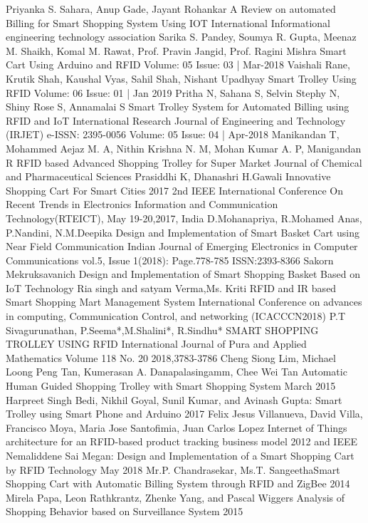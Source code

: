 \documentclass[conference]{IEEEtran}
\begin{document}
\begin{thebibliography}{00}
Priyanka S. Sahara, Anup Gade, Jayant Rohankar A Review on automated Billing for Smart Shopping System Using IOT International Informational engineering technology association 
Sarika S. Pandey, Soumya R. Gupta, Meenaz M. Shaikh, Komal M. Rawat, Prof. Pravin Jangid, Prof. Ragini Mishra Smart Cart Using Arduino and RFID Volume: 05 Issue: 03 | Mar-2018
Vaishali Rane, Krutik Shah, Kaushal Vyas, Sahil Shah, Nishant Upadhyay Smart Trolley Using RFID Volume: 06 Issue: 01 | Jan 2019
Pritha N, Sahana S, Selvin Stephy N, Shiny Rose S, Annamalai S Smart Trolley System for Automated Billing using RFID and IoT International Research Journal of Engineering and Technology (IRJET) e-ISSN: 2395-0056 Volume: 05 Issue: 04 | Apr-2018
Manikandan T, Mohammed Aejaz M. A, Nithin Krishna N. M, Mohan Kumar A. P, Manigandan R RFID based Advanced Shopping Trolley for Super Market Journal of Chemical and Pharmaceutical Sciences
Prasiddhi K, Dhanashri H.Gawali Innovative Shopping Cart For Smart Cities 2017 2nd IEEE International Conference On Recent Trends in Electronics Information and Communication Technology(RTEICT), May 19-20,2017, India
D.Mohanapriya, R.Mohamed Anas, P.Nandini, N.M.Deepika Design and Implementation of Smart Basket Cart using Near Field Communication Indian Journal of Emerging Electronics in Computer Communications vol.5, Issue 1(2018): Page.778-785 ISSN:2393-8366
Sakorn Mekruksavanich Design and Implementation of Smart Shopping Basket Based on IoT Technology
Ria singh and satyam  Verma,Ms. Kriti RFID and IR based Smart Shopping Mart Management System International Conference  on advances in computing, Communication Control, and networking (ICACCCN2018)
P.T Sivagurunathan, P.Seema*,M.Shalini*, R.Sindhu* SMART SHOPPING TROLLEY USING RFID International Journal of Pura and Applied  Mathematics Volume 118 No. 20 2018,3783-3786
Cheng Siong Lim, Michael Loong Peng Tan, Kumerasan A. Danapalasingamm, Chee Wei Tan Automatic Human Guided Shopping Trolley with Smart Shopping System  March 2015
 Harpreet Singh Bedi, Nikhil Goyal, Sunil Kumar, and Avinash Gupta: Smart Trolley using Smart Phone and Arduino 2017
Felix Jesus Villanueva, David Villa, Francisco Moya, Maria Jose Santofimia, Juan Carlos Lopez Internet of Things architecture for an RFID-based product tracking business model 2012 and IEEE
Nemaliddene Sai Megan: Design and Implementation of a Smart Shopping Cart by RFID Technology May 2018
  Mr.P. Chandrasekar, Ms.T. SangeethaSmart Shopping Cart with Automatic Billing System through RFID and ZigBee 2014
 Mirela Papa, Leon Rathkrantz, Zhenke Yang, and Pascal Wiggers  Analysis of Shopping Behavior based on Surveillance System 2015


\end{thebibliography}
\end{document}
